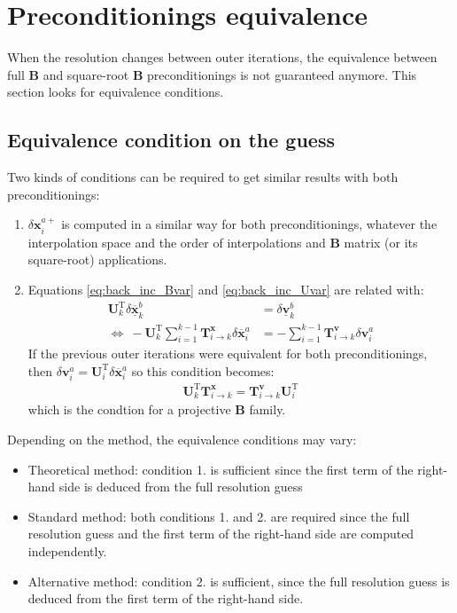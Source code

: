 \documentclass[12pt]{scrartcl}
\begin{document}
\section{Preconditionings equivalence}

When the resolution changes between outer iterations, the equivalence between full $\mathbf{B}$ and square-root $\mathbf{B}$ preconditionings is not guaranteed anymore. This section looks for equivalence conditions.

\subsection{Equivalence condition on the guess}
Two kinds of conditions can be required to get similar results with both preconditionings:
\begin{enumerate}
\item $\delta \mathbf{x}^{a+}_i$ is computed in a similar way for both preconditionings, whatever the interpolation space and the order of interpolations and $\mathbf{B}$ matrix (or its square-root) applications.
\item Equations \eqref{eq:back_inc_Bvar} and \eqref{eq:back_inc_Uvar} are related with:
\begin{align}
\mathbf{U}^\mathrm{T}_k \delta \underline{\overline{\mathbf{x}}}^b_k & = \delta \underline{\mathbf{v}}^b_k \nonumber \\
\Leftrightarrow \ - \mathbf{U}^\mathrm{T}_k  \sum_{i=1}^{k-1} \mathbf{T}^\mathbf{x}_{i \rightarrow k} \delta \overline{\mathbf{x}}^a_i & = - \sum_{i=1}^{k-1} \mathbf{T}^\mathbf{v}_{i \rightarrow k} \delta \mathbf{v}^a_i
\end{align}
If the previous outer iterations were equivalent for both preconditionings, then $\delta \mathbf{v}^a_i = \mathbf{U}^\mathrm{T}_i \delta \overline{\mathbf{x}}^a_i$ so this condition becomes:
\begin{align}
\mathbf{U}^\mathrm{T}_k \mathbf{T}^\mathbf{x}_{i \rightarrow k} = \mathbf{T}^\mathbf{v}_{i \rightarrow k} \mathbf{U}^\mathrm{T}_i
\end{align}
which is the condtion for a projective $\mathbf{B}$ family.
\end{enumerate}

Depending on the method, the equivalence conditions may vary:
\begin{itemize}
\item Theoretical method: condition 1. is sufficient since the first term of the right-hand side is deduced from the full resolution guess
\item Standard method: both conditions 1. and 2. are required since the full resolution guess and the first term of the right-hand side are computed independently.
\item Alternative method: condition 2. is sufficient, since the full resolution guess is deduced from the first term of the right-hand side.
\end{itemize}
\end{document}
